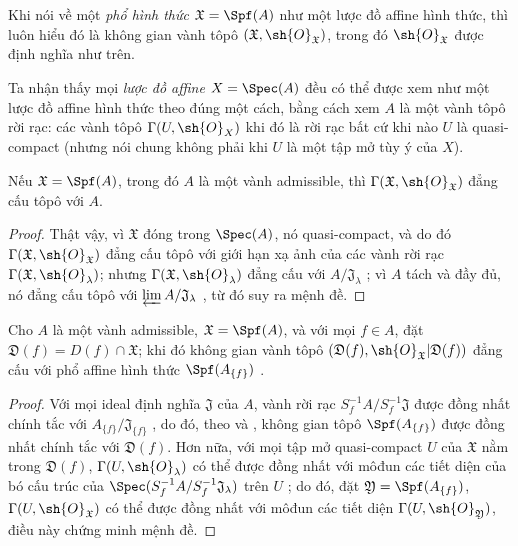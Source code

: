 \documentclass[oneside]{amsart}
\let\EGAOriginalLabel\label
\renewcommand{\label}[1]{\phantomsection\EGAOriginalLabel{#1}}
\begin{document}
Khi nói về một \emph{phổ hình thức $\mathfrak{X}=\Spf(A)$} như một lược đồ affine hình thức, thì luôn hiểu đó là không gian vành tôpô $(\mathfrak{X},\sh{O}_\mathfrak{X})$, trong đó $\sh{O}_\mathfrak{X}$ được định nghĩa như trên.

Ta nhận thấy mọi \emph{lược đồ affine} $X=\Spec(A)$ đều có thể được xem như một lược đồ affine hình thức theo đúng một cách, bằng cách xem $A$ là một vành tôpô rời rạc: các vành tôpô $\Gamma(U,\sh{O}_X)$ khi đó là rời rạc bất cứ khi nào $U$ là quasi-compact (nhưng nói chung không phải khi $U$ là một tập mở tùy ý của $X$).

\begin{proposition}[10.1.3]
\label{I.10.1.3}
Nếu $\mathfrak{X}=\Spf(A)$, trong đó $A$ là một vành admissible, thì $\Gamma(\mathfrak{X},\sh{O}_\mathfrak{X})$ đẳng cấu tôpô với $A$.
\end{proposition}

\begin{proof}
Thật vậy, vì $\mathfrak{X}$ đóng trong $\Spec(A)$, nó quasi-compact, và do đó $\Gamma(\mathfrak{X},\sh{O}_\mathfrak{X})$ đẳng cấu tôpô với giới hạn xạ ảnh của các vành rời rạc $\Gamma(\mathfrak{X},\sh{O}_\lambda)$; nhưng $\Gamma(\mathfrak{X},\sh{O}_\lambda)$ đẳng cấu với $A/\mathfrak{J}_\lambda$ ; vì $A$ tách và đầy đủ, nó đẳng cấu tôpô với $\varprojlim A/\mathfrak{J}_\lambda$ , từ đó suy ra mệnh đề.
\end{proof}

\begin{proposition}[10.1.4]
\label{I.10.1.4}
Cho $A$ là một vành admissible, $\mathfrak{X}=\Spf(A)$, và với mọi $f\in A$, đặt $\mathfrak{D}(f)=D(f)\cap\mathfrak{X}$; khi đó không gian vành tôpô $(\mathfrak{D}(f),\sh{O}_\mathfrak{X}|\mathfrak{D}(f))$ đẳng cấu với phổ affine hình thức $\Spf(A_{\{f\}})$ .
\end{proposition}

\begin{proof}
Với mọi ideal định nghĩa $\mathfrak{J}$ của $A$, vành rời rạc $S_f^{-1}A/ S_f^{-1}\mathfrak{J}$ được đồng nhất chính tắc với $A_{\{f\}}/\mathfrak{J}_{\{f\}}$ , do đó, theo  và , không gian tôpô $\Spf(A_{\{f\}})$ được đồng nhất chính tắc với $\mathfrak{D}(f)$.
Hơn nữa, với mọi tập mở quasi-compact $U$ của $\mathfrak{X}$ nằm trong $\mathfrak{D}(f)$, $\Gamma(U,\sh{O}_\lambda)$ có thể được đồng nhất với môđun các tiết diện của bó cấu trúc của $\Spec(S_f^{-1}A/ S_f^{-1}\mathfrak{J}_\lambda)$ trên $U$ ; do đó, đặt $\mathfrak{Y}=\Spf(A_{\{f\}})$, $\Gamma(U,\sh{O}_\mathfrak{X})$ có thể được đồng nhất với môđun các tiết diện $\Gamma(U,\sh{O}_\mathfrak{Y})$, điều này chứng minh mệnh đề.
\end{proof}
\end{document}
